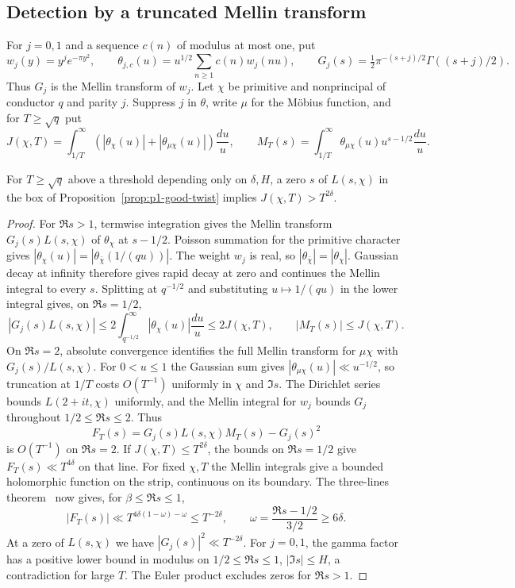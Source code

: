 \subsection{Detection by a truncated Mellin transform}
For $j=0,1$ and a sequence $c(n)$ of modulus at most one, put
\[
 w_j(y)=y^j e^{-\pi y^2},\qquad
 \theta_{j,c}(u)=u^{1/2}\sum_{n\ge1}c(n)w_j(nu),\qquad
 G_j(s)=\tfrac12\pi^{-(s+j)/2}\Gamma((s+j)/2).
\]
Thus $G_j$ is the Mellin transform of $w_j$. Let $\chi$ be primitive and
nonprincipal of conductor $q$ and parity $j$. Suppress $j$ in $\theta$,
write $\mu$ for the M\"obius function, and for $T\ge\sqrt q$ put
\[
 J(\chi,T)=\int_{1/T}^{\infty}
       (|\theta_\chi(u)|+|\theta_{\mu\chi}(u)|)\frac{du}{u},\qquad
 M_T(s)=\int_{1/T}^{\infty}\theta_{\mu\chi}(u)u^{s-1/2}\frac{du}{u}.
\]
\begin{lemma}\label{lem:p1-twist-detect}
For $T\ge\sqrt q$ above a threshold depending only on $\delta,H$, a zero $s$ of
$L(s,\chi)$ in the box of Proposition~\ref{prop:p1-good-twist} implies
$J(\chi,T)>T^{2\delta}$.
\end{lemma}
\begin{proof}
For $\Re s>1$, termwise integration gives the Mellin transform
$G_j(s)L(s,\chi)$ of $\theta_\chi$ at $s-1/2$. Poisson summation for
the primitive character gives
$|\theta_\chi(u)|=|\theta_{\bar\chi}(1/(qu))|$.
The weight $w_j$ is real, so $|\theta_{\bar\chi}|=|\theta_\chi|$.
Gaussian decay at infinity therefore gives rapid decay at zero and
continues the Mellin integral to every $s$. Splitting at $q^{-1/2}$
and substituting $u\mapsto1/(qu)$ in the lower integral gives,
on $\Re s=1/2$,
\[
 |G_j(s)L(s,\chi)|\le 2\int_{q^{-1/2}}^\infty|\theta_\chi(u)|\frac{du}{u}
 \le2J(\chi,T),\qquad |M_T(s)|\le J(\chi,T).
\]
On $\Re s=2$, absolute convergence identifies the full Mellin transform
for $\mu\chi$ with $G_j(s)/L(s,\chi)$. For $0<u\le1$ the Gaussian
sum gives $|\theta_{\mu\chi}(u)|\ll u^{-1/2}$, so truncation at $1/T$
costs $O(T^{-1})$ uniformly in $\chi$ and $\Im s$. The Dirichlet
series bounds $L(2+it,\chi)$ uniformly, and the Mellin integral for
$w_j$ bounds $G_j$ throughout $1/2\le\Re s\le2$. Thus
\[
 F_T(s)=G_j(s)L(s,\chi)M_T(s)-G_j(s)^2
\]
is $O(T^{-1})$ on $\Re s=2$. If $J(\chi,T)\le T^{2\delta}$, the
bounds on $\Re s=1/2$ give $F_T(s)\ll T^{4\delta}$ on that line. For fixed
$\chi,T$ the Mellin integrals give a bounded holomorphic function on
the strip, continuous on its boundary. The three-lines theorem~\cite[Lemma~4.6]{brown} now gives,
for $\beta\le\Re s\le1$,
\[
 |F_T(s)|\ll T^{4\delta(1-\omega)-\omega}\le T^{-2\delta},\qquad
 \omega=\frac{\Re s-1/2}{3/2}\ge6\delta .
\]
At a zero of $L(s,\chi)$ we have $|G_j(s)|^2\ll T^{-2\delta}$.
For $j=0,1$, the gamma factor has a positive lower bound in modulus
on $1/2\le\Re s\le1$, $|\Im s|\le H$, a contradiction for large $T$.
The Euler product excludes zeros for $\Re s>1$.
\end{proof}

